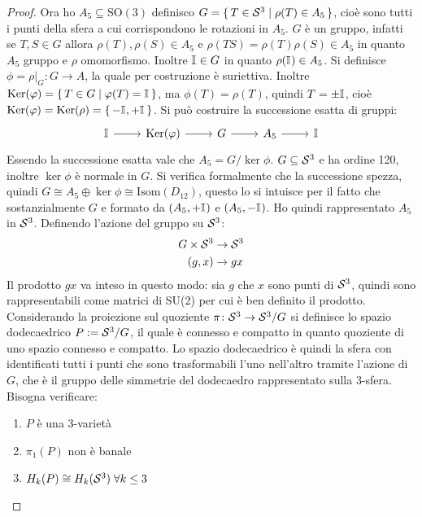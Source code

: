 \begin{proof}
  Ora ho $ A_5 \subseteq \mathrm{SO(3)} $ definisco
  $ G = \set{ T \in \mathcal{S}^{3} | \rho(T) \in A_5} $, cioè sono tutti i punti della sfera a
  cui corrispondono le rotazioni in $ A_5 $. $ G $ è un gruppo, infatti se
  $ T, S \in G $ allora $ \rho(T), \rho(S) \in A_5 $ e
  $ \rho(TS) = \rho(T)\rho(S) \in A_5 $ in quanto $ A_5 $ gruppo e $ \rho $ omomorfismo.
  Inoltre $ \mathbb{I}_{} \in G $ in quanto $ \rho(\mathbb{I}_{}) \in A_5 $. Si definisce
  $ \phi = \rho \lvert_G \colon G \to A $, la quale per costruzione è suriettiva. Inoltre
  $ \mathrm{Ker}( \varphi) = \set{ T \in G | \varphi(T) = \mathbb{I}_{}} $, ma $ \phi(T) = \rho(T) $, quindi
  $ T = \pm \mathbb{I}_{} $, cioè $ \mathrm{Ker}( \varphi) = \mathrm{Ker}( \rho) = \set{- \mathbb{I}_{}, + \mathbb{I}_{}} $. Si può
  costruire la successione esatta di gruppi:
  \[
    \begin{tikzcd}
      \Id{} \arrow{r}{} & \ker{\phi} \arrow{r}{} & G \arrow{r}{} & A_5 \arrow{r}{} & \Id{}
    \end{tikzcd}
  \]
  Essendo la successione esatta vale che $ A_5 = {G} \slash {\ker{\phi}} $.
  $ G \subseteq \mathcal{S}^{3} $ e ha ordine 120, inoltre $ \ker{\phi} $ è normale in
  $ G $. Si verifica formalmente che la successione spezza, quindi
  $ G \cong A_5 \oplus \ker{\phi} \cong \mathrm{Isom}(D_{12}) $, questo lo si intuisce per il
  fatto che sostanzialmente $ G $ e formato da $ (A_5, + \mathbb{I}_{}) $ e
  $ (A_5, - \mathbb{I}_{}) $. Ho quindi rappresentato $ A_5 $ in $ \mathcal{S}^{3} $.
  Definendo l'azione del gruppo su $ \mathcal{S}^{3} $:
  \begin{align*}
    G \times \mathcal{S}^{3} & \to \mathcal{S}^{3} \\
    (g,x) & \to gx
  \end{align*}
  Il prodotto $ gx $ va inteso in questo modo: sia $ g $ che $ x $ sono punti di
  $ \mathcal{S}^{3} $, quindi sono rappresentabili come matrici di SU(2) per cui è ben
  definito il prodotto. Considerando la proiezione sul quoziente
  $ \pi \colon \mathcal{S}^{3} \to {\mathcal{S}^{3}} \slash {G} $ si definisce lo spazio dodecaedrico
  $ P := {\mathcal{S}^{3}} \slash {G} $, il quale è connesso e compatto in quanto quoziente
  di uno spazio connesso e compatto. Lo spazio dodecaedrico è quindi la sfera
  con identificati tutti i punti che sono trasformabili l'uno nell'altro tramite
  l'azione di $ G $, che è il gruppo delle simmetrie del dodecaedro rappresentato
  sulla $ 3 $-sfera.
  Bisogna verificare:
  \begin{enumerate}
  \item $ P $ è una $ 3 $-varietà
  \item $ \pi_1(P) $ non è banale
  \item $ H_k(P) \cong H_k(\mathcal{S}^{3}) \; \forall k \leq 3$

\end{enumerate}
\end{proof}
